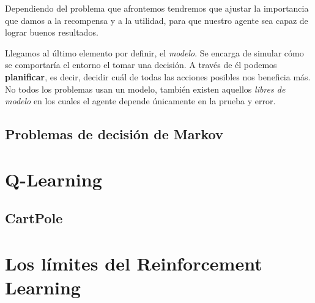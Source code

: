 Dependiendo del problema que afrontemos tendremos que ajustar la importancia que damos a la recompensa y a la utilidad, para que nuestro agente sea capaz de lograr buenos resultados.

Llegamos al último elemento por definir, el \textit{modelo}. Se encarga de simular cómo se comportaría el entorno el tomar una decisión. A través de él podemos \textbf{planificar}, es decir, decidir cuál de todas las acciones posibles nos beneficia más. No todos los problemas usan un modelo, también existen aquellos \textit{libres de modelo} en los cuales el agente depende únicamente en la prueba y error. 

\subsection{Problemas de decisión de Markov}

\section{Q-Learning}

\subsection{CartPole}

\section{Los límites del Reinforcement Learning}
 